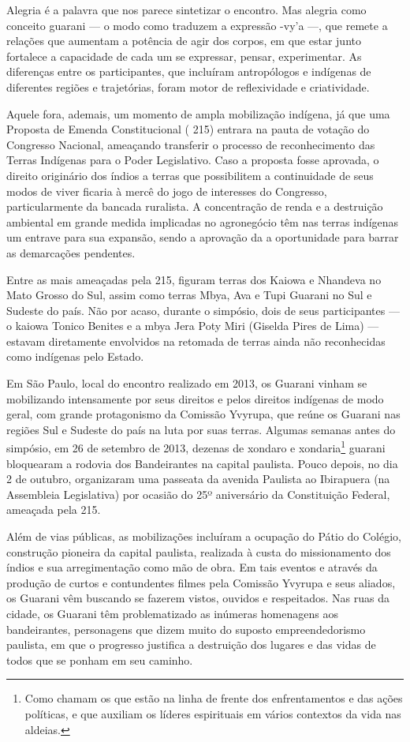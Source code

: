 Alegria é a palavra que nos parece sintetizar o encontro. Mas alegria
como conceito guarani — o modo como traduzem a expressão -vy’a —, que
remete a relações que aumentam a potência de agir dos corpos, em que
estar junto fortalece a capacidade de cada um se expressar, pensar,
experimentar. As diferenças entre os participantes, que incluíram
antropólogos e indígenas de diferentes regiões e trajetórias, foram
motor de reflexividade e criatividade.

Aquele fora, ademais, um momento de ampla mobilização indígena, já que
uma Proposta de Emenda Constitucional ( 215) entrara na pauta de
votação do Congresso Nacional, ameaçando transferir o processo de
reconhecimento das Terras Indígenas para o Poder Legislativo. Caso a
proposta fosse aprovada, o direito originário dos índios a terras que
possibilitem a continuidade de seus modos de viver ficaria à mercê do
jogo de interesses do Congresso, particularmente da bancada ruralista.
A concentração de renda e a destruição ambiental em grande medida
implicadas no agronegócio têm nas terras indígenas um entrave para sua
expansão, sendo a aprovação da  a oportunidade para barrar as
demarcações pendentes.

Entre as mais ameaçadas pela  215, figuram terras dos Kaiowa e
Nhandeva no Mato Grosso do Sul, assim como terras Mbya, Ava e Tupi
Guarani no Sul e Sudeste do país. Não por acaso, durante o simpósio,
dois de seus participantes — o kaiowa Tonico Benites e a mbya Jera Poty
Miri (Giselda Pires de Lima) — estavam diretamente envolvidos na
retomada de terras ainda não reconhecidas como indígenas pelo Estado. 

Em São Paulo, local do encontro realizado em 2013, os Guarani vinham se
mobilizando intensamente por seus direitos e pelos direitos indígenas
de modo geral, com grande protagonismo da Comissão Yvyrupa, que reúne
os Guarani nas regiões Sul e Sudeste do país na luta por suas terras.
Algumas semanas antes do simpósio, em 26 de setembro de 2013, dezenas
de xondaro e xondaria\footnote{Como chamam os que estão na linha de
frente dos enfrentamentos e das ações políticas, e que auxiliam os
líderes espirituais em vários contextos da vida nas aldeias.} guarani
bloquearam a rodovia dos Bandeirantes na capital paulista. Pouco
depois, no dia 2 de outubro, organizaram uma passeata da avenida
Paulista ao Ibirapuera (na Assembleia Legislativa) por ocasião do 25º
aniversário da Constituição Federal, ameaçada pela  215. 

Além de vias públicas, as mobilizações incluíram a ocupação do Pátio do
Colégio, construção pioneira da capital paulista, realizada à custa do
missionamento dos índios e sua arregimentação como mão de obra. Em tais
eventos e através da produção de curtos e contundentes filmes pela
Comissão Yvyrupa e seus aliados, os Guarani vêm buscando se fazerem
vistos, ouvidos e respeitados. Nas ruas da cidade, os Guarani têm
problematizado as inúmeras homenagens aos bandeirantes, personagens que
dizem muito do suposto empreendedorismo paulista, em que o progresso
justifica a destruição dos lugares e das vidas de todos que se ponham
em seu caminho.

